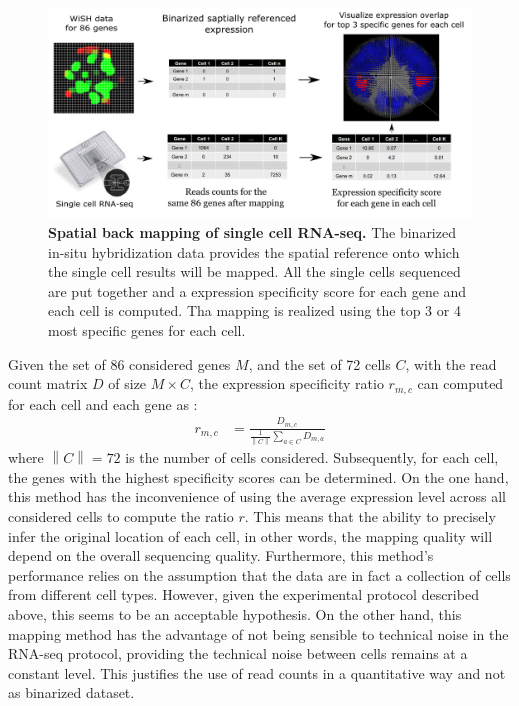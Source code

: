 	\begin{figure}[h]
\centerline{\includegraphics[width=1.5\linewidth]{gfx/chapter2/backmap.png}}
\caption{{\bf Spatial back mapping of single cell RNA-seq.} The binarized in-situ hybridization data provides the spatial reference onto which the single cell results will be mapped. All the single cells sequenced are put together and a expression specificity score for each gene and each cell is computed. Tha mapping is realized using the top 3 or 4 most specific genes for each cell.}\label{fig:backmap}
	\end{figure}
	
	Given the set of 86 considered genes $M$, and the set of 72 cells $C$, with the read count matrix $D$ of size $M\times C$, the expression specificity ratio $r_{m,c}$ can computed for each cell and each gene as :
\begin{eqnarray*}
	r_{m,c} &= \frac{D_{m,c}}{\frac{1}{\left\|C\right\|}\sum_{a \in C}D_{m,a}}
\end{eqnarray*}
where $\left\|C\right\| = 72 $ is the number of cells considered. Subsequently, for each cell, the genes with the highest specificity scores can be determined. On the one hand, this method has the inconvenience of using the average expression level across all considered cells to compute the ratio $r$. This means that the ability to precisely infer the original location of each cell, in other words, the mapping quality will depend on the overall sequencing quality. Furthermore, this method's performance relies on the assumption that the data are in fact a collection of cells from different cell types. However, given the experimental protocol described above, this seems to be an acceptable hypothesis. On the other hand, this mapping method has the advantage of not being sensible to technical noise in the RNA-seq protocol, providing the technical noise between cells remains at a constant level. This justifies the use of read counts in a quantitative way and not as binarized dataset.\\

